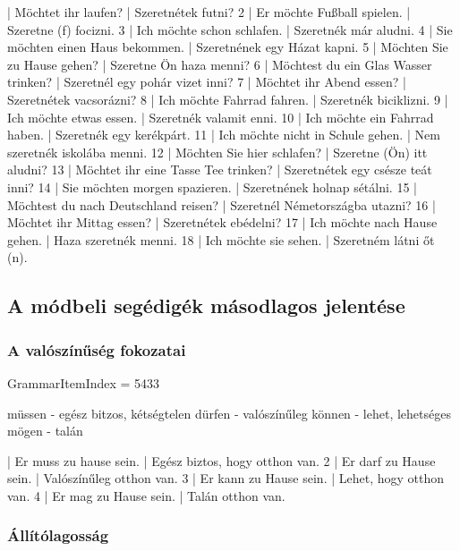 \documentclass{article}
\newenvironment{desc}{\verbatim}{\endverbatim}
\newenvironment{exmp}{\verbatim}{\endverbatim}
\begin{document}
\begin{exmp}
1 | Möchtet ihr laufen? | Szeretnétek futni?
2 | Er möchte Fußball spielen. | Szeretne (f) focizni.
3 | Ich möchte schon schlafen. | Szeretnék már aludni.
4 | Sie möchten einen Haus bekommen. | Szeretnének egy Házat kapni.
5 | Möchten Sie zu Hause gehen? | Szeretne Ön haza menni?
6 | Möchtest du ein Glas Wasser trinken? | Szeretnél egy pohár vizet inni?
7 | Möchtet ihr Abend essen? | Szeretnétek vacsorázni?
8 | Ich möchte Fahrrad fahren. | Szeretnék biciklizni.
9 | Ich möchte etwas essen. | Szeretnék valamit enni.
10 | Ich möchte ein Fahrrad haben. | Szeretnék egy kerékpárt.
11 | Ich möchte nicht in Schule gehen. | Nem szeretnék iskolába menni.
12 | Möchten Sie hier schlafen? | Szeretne (Ön) itt aludni?
13 | Möchtet ihr eine Tasse Tee trinken? | Szeretnétek egy csésze teát inni?
14 | Sie möchten morgen spazieren. | Szeretnének holnap sétálni.
15 | Möchtest du nach Deutschland reisen? | Szeretnél Németországba utazni?
16 | Möchtet ihr Mittag essen? | Szeretnétek ebédelni?
17 | Ich möchte nach Hause gehen. | Haza szeretnék menni.
18 | Ich möchte sie sehen. | Szeretném látni őt (n).
\end{exmp}

\subsection{A módbeli segédigék másodlagos jelentése}

\subsubsection{A valószínűség fokozatai}

GrammarItemIndex = 5433

\begin{desc}
müssen - egész bitzos, kétségtelen
dürfen - valószínűleg
können - lehet, lehetséges
mögen - talán
\end{desc}

\begin{exmp}
1 | Er muss zu hause sein. | Egész biztos, hogy otthon van.
2 | Er darf zu Hause sein. | Valószínűleg otthon van.
3 | Er kann zu Hause sein. | Lehet, hogy otthon van.
4 | Er mag zu Hause sein. | Talán otthon van.
\end{exmp}

\subsubsection{Állítólagosság}
\end{document}
